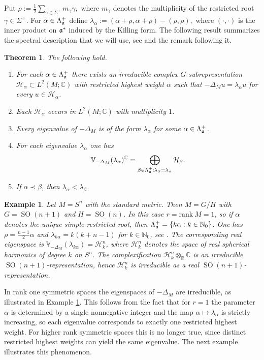 \documentclass[reqno,twoside,12pt]{amsart}
\newtheorem{Example}[Remark]{Example}
\newtheorem{Theorem}[Remark]{Theorem}
\newcommand{\bC}{\mathbb{C}}
\newcommand{\bN}{\mathbb{N}}
\newcommand{\bR}{\mathbb{R}}
\newcommand{\bV}{\mathbb{V}}
\newcommand{\cH}{\mathcal{H}}
\numberwithin{equation}{section} \errorcontextlines=0
\newcommand{\rank}{\mathrm{rank}\:}
\newcommand{\SO}{\operatorname{SO}}
\begin{document}
Put
$\rho:=\frac12\sum_{\gamma\in\Sigma^+}m_\gamma\gamma,$
where $m_\gamma$ denotes the multiplicity of the restricted root $\gamma\in\Sigma^+$.
For $\alpha\in\Lambda_{\frak a}^+$ define
$\lambda_\alpha:=(\alpha+\rho,\alpha+\rho)-(\rho,\rho),$
where $(\cdot,\cdot)$ is the inner product on $\frak a^*$ induced by the Killing form.
The following result summarizes the spectral description that we will use, see \cite[Thm. 5.7.2]{Gurarie} and the remark following it.

\begin{Theorem}\label{thm:HC-spectrum}
The following hold.
\begin{enumerate}
\item For each $\alpha\in\Lambda_{\frak a}^+$ there exists an irreducible complex $G$-subrepresentation $\cH_\alpha\subset L^2(M;\bC)$ with restricted highest weight $\alpha$ such that $-\Delta_Mu=\lambda_\alpha u$ for every $u\in\cH_\alpha$.
\item Each $\cH_\alpha$ occurs in $L^2(M;\bC)$ with multiplicity $1$.
\item Every eigenvalue of $-\Delta_M$ is of the form $\lambda_\alpha$ for some $\alpha\in\Lambda_{\frak a}^+$.
\item For each eigenvalue $\lambda_\alpha$ one has
\[
\bV_{-\Delta_M}(\lambda_\alpha)^\bC=\bigoplus_{\beta\in\Lambda_{\frak a}^+:\lambda_\beta=\lambda_\alpha}\cH_\beta.
\]
\item If $\alpha\prec\beta$, then $\lambda_\alpha<\lambda_\beta$.
\end{enumerate}
\end{Theorem}


\begin{Example}\label{ex:sphere}
Let $M=S^n$ with the standard metric. Then $M=G/H$ with $G=\SO(n+1)$ and $H=\SO(n)$. In this case $r=\rank M=1$, so if $\alpha$ denotes the unique simple restricted root, then $\Lambda_{\frak a}^+=\{k\alpha:k\in\bN_0\}$. One has $\rho=\frac{n-1}{2}\alpha$ and
$
\lambda_{k\alpha}=k(k+n-1)
$
for $k\in\bN_0$, see \cite[Section 5.7.8, Eq. (7.15)]{Gurarie}. The corresponding real eigenspace is $\bV_{-\Delta_M}(\lambda_{k\alpha})=\cH_k^n$, where $\cH_k^n$ denotes the space of real spherical harmonics of degree $k$ on $S^n$. The complexification $\cH_k^n\otimes_\bR\bC$ is an irreducible $\SO(n+1)$-representation, hence $\cH_k^n$ is irreducible as a real $\SO(n+1)$-representation.
\end{Example}

In rank one symmetric spaces the eigenspaces of $-\Delta_M$ are irreducible, as illustrated in Example \ref{ex:sphere}. This follows from the fact that for $r=1$ the parameter $\alpha$ is determined by a single nonnegative integer and the map $\alpha\mapsto\lambda_\alpha$ is strictly increasing, so each eigenvalue corresponds to exactly one restricted highest weight.
For higher rank symmetric spaces this is no longer true, since distinct restricted highest weights can yield the same eigenvalue. The next example illustrates this phenomenon.
\end{document}
